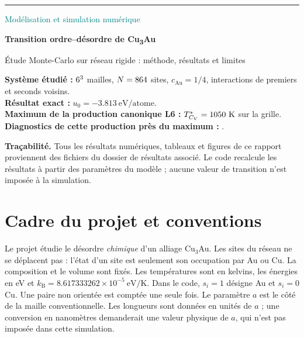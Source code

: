 \documentclass[10pt,a4paper]{article}
\newcommand{\Au}{\mathrm{Au}}
\newcommand{\kb}{k_{\mathrm B}}
\begin{document}
\hypersetup{pageanchor=false}
\begin{titlepage}
\vspace*{5mm}
{\color{teal}\rule{\linewidth}{2pt}}
\vspace{9mm}
{\Large\textcolor{teal}{Modélisation et simulation numérique}\par}
\vspace{8mm}
{\Huge\bfseries\color{navy} Transition ordre--désordre de Cu\textsubscript{3}Au\par}
\vspace{5mm}
{\large Étude Monte-Carlo sur réseau rigide : méthode, résultats et limites\par}
\vspace{8mm}
\begin{tcolorbox}[colback=pale,colframe=navy,boxrule=.8pt]
\textbf{Système étudié :} $6^3$ mailles, $N=864$ sites,
$c_{\Au}=1/4$, interactions de premiers et seconds voisins.\\[2mm]
\textbf{Résultat exact :} $u_0=-3.813\ \mathrm{eV/atome}$.\\[2mm]
\textbf{Maximum de la production canonique L6 :} $T^*_{C_V}=1050\ \mathrm K$ sur la grille.\\[2mm]
\textbf{Diagnostics de cette production près du maximum :} \DiagnosticStatus.
\end{tcolorbox}
\vfill
\textbf{Traçabilité.} Tous les résultats numériques, tableaux et figures de ce
rapport proviennent des fichiers du dossier de résultats associé. Le code
recalcule les résultats à partir des paramètres du modèle ; aucune valeur
de transition n'est imposée à la simulation.
\vspace{8mm}
\end{titlepage}
\hypersetup{pageanchor=true}
\tableofcontents
\newpage

\section*{Cadre du projet et conventions}
Le projet étudie le désordre \emph{chimique} d'un alliage Cu$_3$Au. Les sites
du réseau ne se déplacent pas : l'état d'un site est seulement son occupation
par Au ou Cu. La composition et le volume sont fixés. Les températures sont
en kelvins, les énergies en eV et $\kb=8.617333262\times10^{-5}\ \mathrm{eV/K}$.
Dans le code, $s_i=1$ désigne Au et $s_i=0$ Cu. Une paire non orientée est
comptée une seule fois.
Le paramètre $a$ est le côté de la maille conventionnelle. Les longueurs
sont données en unités de $a$ ; une conversion en nanomètres demanderait
une valeur physique de $a$, qui n'est pas imposée dans cette simulation.
\end{document}
